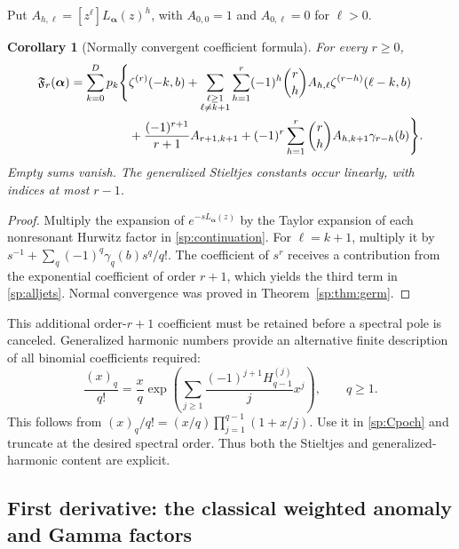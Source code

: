 \documentclass[11pt,letterpaper]{article}
\numberwithin{equation}{section}
\theoremstyle{plain}
\newtheorem{corollary}[theorem]{Corollary}
\theoremstyle{definition}
\theoremstyle{remark}
\begin{document}
Put $A_{h,\ell}=[z^\ell]L_{\boldsymbol\alpha}(z)^h$, with
$A_{0,0}=1$ and $A_{0,\ell}=0$ for $\ell>0$.

\begin{corollary}[Normally convergent coefficient formula]\label{sp:cor:alljets}
For every $r\ge0$,
\begin{align}\label{sp:alljets}
 \mathfrak F_r(\boldsymbol\alpha)
 =\sum_{k=0}^Dp_k\Bigg\{&\zeta^{(r)}(-k,b)
 +\sum_{\substack{\ell\ge1\\\ell\ne k+1}}\sum_{h=1}^r
   (-1)^h\binom rh A_{h,\ell}\zeta^{(r-h)}(\ell-k,b)\notag\\
 &+\frac{(-1)^{r+1}}{r+1}A_{r+1,k+1}
   +(-1)^r\sum_{h=1}^r\binom rh A_{h,k+1}\gamma_{r-h}(b)
                                      \Bigg\}.
\end{align}
Empty sums vanish. The generalized Stieltjes constants occur linearly,
with indices at most $r-1$.
\end{corollary}
\begin{proof}
Multiply the expansion of $e^{-sL_{\boldsymbol\alpha}(z)}$ by the
Taylor expansion of each nonresonant Hurwitz factor in
\eqref{sp:continuation}. For $\ell=k+1$, multiply it by
$s^{-1}+\sum_q(-1)^q\gamma_q(b)s^q/q!$. The coefficient of $s^r$
receives a contribution from the exponential coefficient of order
$r+1$, which yields the third term in \eqref{sp:alljets}. Normal
convergence was proved in Theorem~\ref{sp:thm:germ}.
\end{proof}

This additional order-$r+1$ coefficient must be retained before a
spectral pole is canceled. Generalized harmonic numbers provide an
alternative finite description of all binomial coefficients required:
\begin{equation}\label{sp:harmonic}
 \frac{(x)_q}{q!}
 =\frac xq\exp\left(\sum_{j\ge1}
                   \frac{(-1)^{j+1}H_{q-1}^{(j)}}j x^j\right),
 \qquad q\ge1.
\end{equation}
This follows from $(x)_q/q!=(x/q)\prod_{j=1}^{q-1}(1+x/j)$.
Use it in \eqref{sp:Cpoch} and truncate at the desired spectral order.
Thus both the Stieltjes and generalized-harmonic content are explicit.

\subsection{First derivative: the classical weighted anomaly and Gamma factors}
\end{document}
